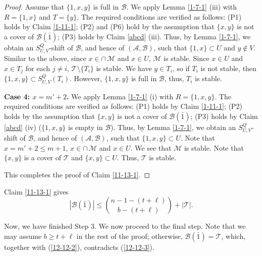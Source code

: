 \documentclass[11pt]{article}
\def\marrow{{\boldmath {\marginpar[\hfill$\rightarrow \rightarrow$]{$\leftarrow \leftarrow$}}}}
\def\andrey#1{{\sc Andrey: }{\marrow\sf \textcolor{blue}{#1}}}
\newcommand{\m}{\mathcal}
\begin{document}
\begin{proof}
Assume that $\{1,x,y\}$ is full in $\m B$.  
We apply Lemma \ref{1-7-1} (iii) with $R=\{1,x\}$ and $T=\{y\}$. 
The required conditions are verified as follows:
 (P1) holds by Claim \ref{1-11-1}; 
 (P2) and (P6) hold by the assumption that $\{x,y\}$ is not a cover of $\m B(\bar1)$; 
 (P3) holds by Claim \ref{abcd} (iii). 
 Thus, by Lemma \ref{1-7-1}, we obtain an $S_{U,V}^Q$-shift of $\m B$, and hence of $(\m A, \m B)$, such that $\{1, x\}\subset U$ and $y\not\in V$. 
Similar to the above, since $x\in\cap\,\m M$ and $x\in U$,  $\mathcal{M}$ is stable. 
Since $x\in U$ and $x\in T_j$ for each $j\ne i$, $\m T \setminus \{T_i\}$ is stable. 
We have $y\in T_i$, so if $T_i$ is not stable, then $\{1, x, y\}\subset S_{U,V}^Q(T_i)$. However, 
 $\{1,x,y\}$ is full in $\m B$, thus, $T_i$ is stable.  



{\bf Case 4: $x = m'+2$.}
We apply Lemma \ref{1-7-1} (i) with $R=\{1,x, y\}$. 
The required conditions are verified as follows:
 (P1) holds by Claim \ref{1-11-1}; 
 (P2) holds by the assumption that $\{x,y\}$ is not a cover of $\m B(\bar1)$; 
 (P3) holds by Claim \ref{abcd} (iv) ($\{1,x,y \}$ is empty in $\m B$). 
 Thus, by Lemma \ref{1-7-1}, we obtain an $S_{U,V}^Q$-shift of $\m B$, and hence of $(\m A, \m B)$, such that $\{1, x, y\}\subset U$. 
Note that $x=m'+2\le m+1$, $x\in \cap \, \m M$ and $x\in U$. 
We see that $\mathcal{M}$ is stable. 
Note that $\{x,y\}$ is a cover of $\m T$ and $\{x,y\}\subset U$. Thus,
$\mathcal{T}$ is stable. 

 This completes the proof of Claim \ref{11-13-1}.
\end{proof}


Claim \ref{11-13-1} gives  
\[
|\mathcal{B}(\bar{1})|\le {n-1-(t+\ell)\choose b-(t+\ell)}+|\mathcal{T}|.
\]

Now, we have finished Step 3. We now proceed to the final step. 
Note that we may assume $b\ge t+\ell$ in the rest of the proof; otherwise, $\mathcal{B}(\bar{1})=\mathcal{T}$, which, together with (\ref{12-12-2}), contradicts  (\ref{12-12-3}). 

\end{document}
